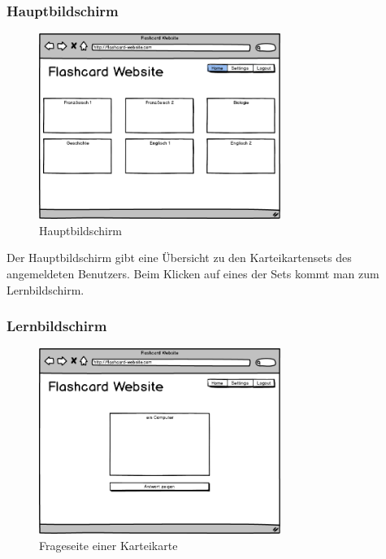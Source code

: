 \subsubsection{Hauptbildschirm}

\begin{figure}[H]
    \centering
    \includegraphics[width=0.7\textwidth]{images/Overview.png}
    \caption{Hauptbildschirm}
    \label{fig:overview}
\end{figure}

Der Hauptbildschirm gibt eine Übersicht zu den Karteikartensets des angemeldeten Benutzers. Beim Klicken auf eines der Sets kommt man zum Lernbildschirm.


\subsubsection{Lernbildschirm}


\begin{figure}[H]
    \centering
    \includegraphics[width=0.7\textwidth]{images/Lernscreen-Frage.png}
    \caption{Frageseite einer Karteikarte}
    \label{fig:lernscreen-frage}
\end{figure}

